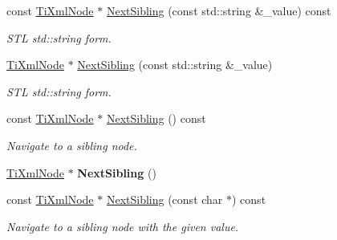 \begin{DoxyCompactItemize}
\hypertarget{class_ti_xml_node_a5f0bf3809d4a35456d28cc9522c26245}{}\label{class_ti_xml_node_a5f0bf3809d4a35456d28cc9522c26245} 
const \hyperlink{class_ti_xml_node}{Ti\+Xml\+Node} $\ast$ \hyperlink{class_ti_xml_node_a5f0bf3809d4a35456d28cc9522c26245}{Next\+Sibling} (const std\+::string \&\+\_\+value) const
\begin{DoxyCompactList}\small\item\em S\+TL std\+::string form. \end{DoxyCompactList}\item 
\hypertarget{class_ti_xml_node_a1757c1f4d01e8c9596ffdbd561c76aea}{}\label{class_ti_xml_node_a1757c1f4d01e8c9596ffdbd561c76aea} 
\hyperlink{class_ti_xml_node}{Ti\+Xml\+Node} $\ast$ \hyperlink{class_ti_xml_node_a1757c1f4d01e8c9596ffdbd561c76aea}{Next\+Sibling} (const std\+::string \&\+\_\+value)
\begin{DoxyCompactList}\small\item\em S\+TL std\+::string form. \end{DoxyCompactList}\item 
\hypertarget{class_ti_xml_node_ae99c572ac7901a15993ea7a4efaa10e7}{}\label{class_ti_xml_node_ae99c572ac7901a15993ea7a4efaa10e7} 
const \hyperlink{class_ti_xml_node}{Ti\+Xml\+Node} $\ast$ \hyperlink{class_ti_xml_node_ae99c572ac7901a15993ea7a4efaa10e7}{Next\+Sibling} () const
\begin{DoxyCompactList}\small\item\em Navigate to a sibling node. \end{DoxyCompactList}\item 
\hypertarget{class_ti_xml_node_a4d05f7b1d7b470ac6887edd072d4892a}{}\label{class_ti_xml_node_a4d05f7b1d7b470ac6887edd072d4892a} 
\hyperlink{class_ti_xml_node}{Ti\+Xml\+Node} $\ast$ {\bfseries Next\+Sibling} ()
\item 
\hypertarget{class_ti_xml_node_a0864ea784b53cdca0a37829d3391ca4b}{}\label{class_ti_xml_node_a0864ea784b53cdca0a37829d3391ca4b} 
const \hyperlink{class_ti_xml_node}{Ti\+Xml\+Node} $\ast$ \hyperlink{class_ti_xml_node_a0864ea784b53cdca0a37829d3391ca4b}{Next\+Sibling} (const char $\ast$) const
\begin{DoxyCompactList}\small\item\em Navigate to a sibling node with the given \textquotesingle{}value\textquotesingle{}. \end{DoxyCompactList}\item 
\hypertarget{class_ti_xml_node_a4080bc5cc8a5c139e7cf308669e850fc}{}\label{class_ti_xml_node_a4080bc5cc8a5c139e7cf308669e850fc} 

\end{DoxyCompactItemize}
